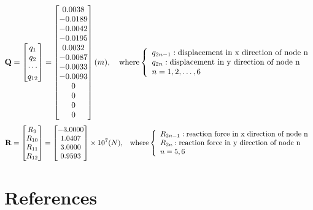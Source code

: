 \documentclass[12pt, a4paper]{article}
\begin{document}
    \begin{equation}
    	\mathbf{Q}=
        \begin{bmatrix}
        	q_1 \\ q_2 \\ \cdots \\q_{12}
        \end{bmatrix}
        =
        \begin{bmatrix}
        	0.0038\\
           -0.0189\\
           -0.0042\\
           -0.0195\\
            0.0032\\
           -0.0087\\
           -0.0033\\
           -0.0093\\
                 0\\
                 0\\
                 0\\
                 0
        \end{bmatrix}
        (m)
        ,\textrm{\quad where}
        \left\{
        \begin{array}{l}
        q_{2n-1}: \textrm{displacement in x direction of node n}\\
        q_{2n}: \textrm{displacement in y direction of node n}\\
        n=1,2,\ldots,6
        \end{array}
        \right.
    \end{equation}
    \begin{equation}
    	\mathbf{R}=
        \begin{bmatrix}
           R_{9}\\R_{10}\\R_{11}\\R_{12}
        \end{bmatrix}
        =
        \begin{bmatrix}
        	-3.0000\\
            1.0407\\
            3.0000\\
            0.9593
        \end{bmatrix}
        \times10^7
        (N)
        \textrm{,\quad where}
        \left\{
        \begin{array}{l}
        R_{2n-1}: \textrm{reaction force in x direction of node n}\\
        R_{2n}: \textrm{reaction force in y direction of node n}\\
        n=5,6
        \end{array}
        \right.
    \end{equation}



\section{References}
\begingroup
    \renewcommand{\section}[2]{}
    
    
\endgroup
\end{document}

